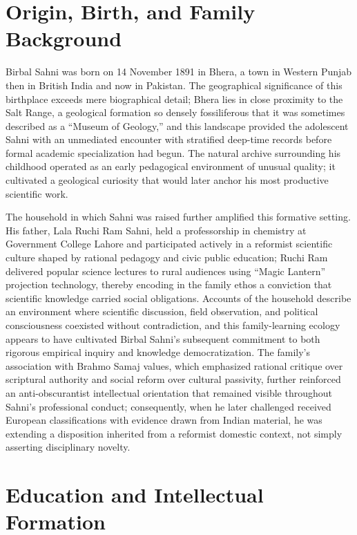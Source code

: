 \documentclass[10pt]{article}
\begin{document}
\section*{Origin, Birth, and Family Background}

Birbal Sahni was born on 14 November 1891 in Bhera, a town in Western Punjab then in British India and now in Pakistan.\cite{wiki_birbal} The geographical significance of this birthplace exceeds mere biographical detail; Bhera lies in close proximity to the Salt Range, a geological formation so densely fossiliferous that it was sometimes described as a ``Museum of Geology,'' and this landscape provided the adolescent Sahni with an unmediated encounter with stratified deep-time records before formal academic specialization had begun.\cite{from_lahore_lucknow} The natural archive surrounding his childhood operated as an early pedagogical environment of unusual quality; it cultivated a geological curiosity that would later anchor his most productive scientific work.

The household in which Sahni was raised further amplified this formative setting. His father, Lala Ruchi Ram Sahni, held a professorship in chemistry at Government College Lahore\cite{ruchi_ram} and participated actively in a reformist scientific culture shaped by rational pedagogy and civic public education; Ruchi Ram delivered popular science lectures to rural audiences using ``Magic Lantern'' projection technology, thereby encoding in the family ethos a conviction that scientific knowledge carried social obligations.\cite{punjab_science} Accounts of the household describe an environment where scientific discussion, field observation, and political consciousness coexisted without contradiction, and this family-learning ecology appears to have cultivated Birbal Sahni's subsequent commitment to both rigorous empirical inquiry and knowledge democratization.\cite{from_lahore_lucknow} The family's association with Brahmo Samaj values, which emphasized rational critique over scriptural authority and social reform over cultural passivity, further reinforced an anti-obscurantist intellectual orientation that remained visible throughout Sahni's professional conduct; consequently, when he later challenged received European classifications with evidence drawn from Indian material, he was extending a disposition inherited from a reformist domestic context, not simply asserting disciplinary novelty.


\section*{Education and Intellectual Formation}
\end{document}
